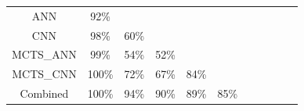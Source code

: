 \documentclass[a4paper,12pt,table]{article}
\begin{document}
\begin{table}[H]
{\begin{tabular}{|c|cccccccccc}
    ANN            & \multicolumn{1}{c|}{92\%}                       & \cellcolor[HTML]{000000}                        & \cellcolor[HTML]{000000}{\color[HTML]{333333} } & \cellcolor[HTML]{000000}{\color[HTML]{333333} } & \cellcolor[HTML]{000000}                        & \cellcolor[HTML]{000000}                        & \cellcolor[HTML]{000000}                        & \cellcolor[HTML]{000000}                        & \cellcolor[HTML]{000000}                        & \cellcolor[HTML]{000000}                        \\ \cline{1-3}
    CNN            & \multicolumn{1}{c|}{98\%}                       & \multicolumn{1}{c|}{60\%}                       & \cellcolor[HTML]{000000}{\color[HTML]{000000} } & \cellcolor[HTML]{000000}{\color[HTML]{333333} } & \cellcolor[HTML]{000000}                        & \cellcolor[HTML]{000000}                        & \cellcolor[HTML]{000000}                        & \cellcolor[HTML]{000000}                        & \cellcolor[HTML]{000000}                        & \cellcolor[HTML]{000000}                        \\ \cline{1-4}
    MCTS\_ANN      & \multicolumn{1}{c|}{99\%}                       & \multicolumn{1}{c|}{54\%}                       & \multicolumn{1}{c|}{52\%}                       & \cellcolor[HTML]{000000}{\color[HTML]{000000} } & \cellcolor[HTML]{000000}{\color[HTML]{000000} } & \cellcolor[HTML]{000000}{\color[HTML]{000000} } & \cellcolor[HTML]{000000}{\color[HTML]{000000} } & \cellcolor[HTML]{000000}{\color[HTML]{000000} } & \cellcolor[HTML]{000000}{\color[HTML]{000000} } & \cellcolor[HTML]{000000}{\color[HTML]{000000} } \\ \cline{1-5}
    MCTS\_CNN      & \multicolumn{1}{c|}{100\%}                      & \multicolumn{1}{c|}{72\%}                       & \multicolumn{1}{c|}{67\%}                       & \multicolumn{1}{c|}{84\%}                       & \cellcolor[HTML]{000000}                        & \cellcolor[HTML]{000000}                        & \cellcolor[HTML]{000000}                        & \cellcolor[HTML]{000000}                        & \cellcolor[HTML]{000000}                        & \cellcolor[HTML]{000000}                        \\ \cline{1-6}
    Combined        & \multicolumn{1}{c|}{100\%}                     & \multicolumn{1}{c|}{94\%}                       & \multicolumn{1}{c|}{90\%}                       & \multicolumn{1}{c|}{89\%}                       & \multicolumn{1}{c|}{85\%}                       & \cellcolor[HTML]{000000}                     & \cellcolor[HTML]{000000}                       & \cellcolor[HTML]{000000}                        & \cellcolor[HTML]{000000}                        & \cellcolor[HTML]{000000}                        \\ \cline{1-7}

\end{tabular}}
\end{table}
\end{document}
